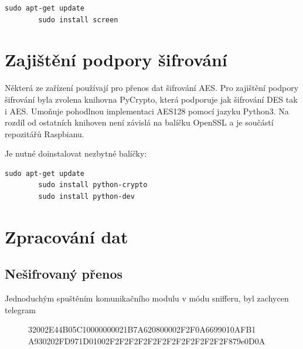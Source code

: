 \begin{lstlisting}[style=MyCodeBash]
		sudo apt-get update
		sudo install screen		
	\end{lstlisting}



\section{Zajištění podpory šifrování}
Některá ze zařízení používají pro přenos dat šifrování AES. Pro zajištění podpory šifrování byla zvolena knihovna PyCrypto, která podporuje jak šifrování DES tak i AES. 
Umoňuje pohodlnou implementaci AES128 pomocí jazyku Python3. Na rozdíl od ostatních knihoven není závislá na balíčku OpenSSL a je součástí repozitářů Raspbianu. 

Je nutné doinstalovat nezbytné balíčky:	
 
\begin{lstlisting}[style=MyCodeBash]
		sudo apt-get update
		sudo install python-crypto
		sudo install python-dev
	\end{lstlisting}
	\vspace{-20pt}


\section{Zpracování dat}

\subsection{Nešifrovaný přenos}

Jednoduchým spuštěním komunikačního modulu v módu snifferu, byl zachycen telegram

\vspace{-10pt}
\begin{figure}[!ht]
\begin{centerverbatim}
	32002E44B05C10000000021B7A620800002F2F0A6699010AFB1
	A930202FD971D01002F2F2F2F2F2F2F2F2F2F2F2F2F879e0D0A
\end{centerverbatim}
\end{figure}

